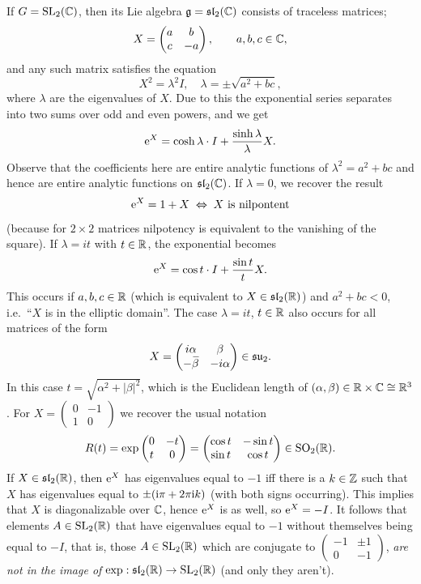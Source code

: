 \begin{example}
If $G=\operatorname{SL}_2(\mathbb{C})$, then its Lie algebra $\mathfrak{g}=\mathfrak{sl}_2(\mathbb{C})$ consists of traceless matrices;
\[X=\begin{pmatrix}
    a&b\\c&-a
\end{pmatrix},\quad \quad a,b,c\in\mathbb{C},\]
and any such matrix satisfies the equation
\[X^2=\lambda^2 I,\quad \lambda=\pm \sqrt{a^2+bc},\]
where $\lambda$ are the eigenvalues of $X$. Due to this the exponential series separates into two sums over odd and even powers, and we get
\[\mathrm{e}^X=\cosh \lambda \cdot I+\frac{\sinh \lambda}{\lambda}X.\]
Observe that the coefficients here are entire analytic functions of $\lambda^2=a^2+bc$ and hence are entire analytic functions on $\mathfrak{sl}_2(\mathbb{C})$. If $\lambda=0$, we recover the result
\[\mathrm{e}^X=1+X \; \Leftrightarrow \; X\text{ is nilpontent}\]
(because for $2\times 2$ matrices nilpotency is equivalent to the vanishing of the square). If $\lambda=it$ with $t\in \mathbb{R}$, the exponential becomes
\[\mathrm{e}^X=\cos t\cdot I+\frac{\sin t}{t}X.\]
This occurs if $a,b,c\in\mathbb{R}$ (which is equivalent to $X\in\mathfrak{sl}_2(\mathbb{R})$) and $a^2+bc<0$, i.e.\ ``$X$ is in the elliptic domain''. The case $\lambda=it$, $t\in\mathbb{R}$ also occurs for all matrices of the form
\[X=\begin{pmatrix}
    i\alpha&\beta\\-\wb{\beta}&-i\alpha
\end{pmatrix}\in\mathfrak{su}_2.\]
In this case $t=\sqrt{\alpha^2+|\beta|^2}$, which is the Euclidean length of $(\alpha,\beta)\in\mathbb{R}\times\mathbb{C}\cong \mathbb{R}^3$. For $X=\begin{pmatrix}
    0&-1\\1&0
\end{pmatrix}$ we recover the usual notation
\[R(t)=\exp \begin{pmatrix}
    0&-t\\t&0
\end{pmatrix}=\begin{pmatrix}
    \cos t&-\sin t\\\sin t&\cos t
\end{pmatrix}\in\operatorname{SO}_2(\mathbb{R}).\]
If $X\in\mathfrak{sl}_2(\mathbb{R})$, then $\mathrm{e}^X$ has eigenvalues equal to $-1$ iff there is a $k\in\mathbb{Z}$ such that $X$ has eigenvalues equal to $\pm(\mathrm{i}\pi+2\pi \mathrm{i} k)$ (with both signs occurring). This implies that $X$ is diagonalizable over $\mathbb{C}$, hence $\mathrm{e}^X$ is as well, so $\mathrm{e}^X=-I$. It follows that elements $A\in\operatorname{SL}_2(\mathbb{R})$ that have eigenvalues equal to $-1$ without themselves being equal to $-I$, that is, those $A\in\operatorname{SL}_2(\mathbb{R})$ which are conjugate to $\left(\begin{smallmatrix}
    -1&\pm1\\0&-1
\end{smallmatrix}\right)$, \emph{are not in the image of $\exp:\mathfrak{sl}_2(\mathbb{R})\to \operatorname{SL}_2(\mathbb{R})$} (and only they aren't).


\end{example}
